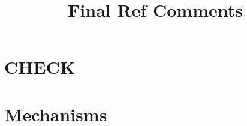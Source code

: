 \documentclass{article}
\title{Final Ref Comments}
\begin{document}
\maketitle
\tableofcontents
{\footnotesize 
\listoffigures
\listoftables}
\clearpage

\section{CHECK}
\clearpage
\begin{table}
\footnotesize
\centering
\caption{WF}
\begin{threeparttable}
\scriptsize

\end{threeparttable}
\label{tab:log_effect}
\end{table}
\clearpage

\begin{table}
\footnotesize
\centering
\caption{WF}
\begin{threeparttable}
\scriptsize

\end{threeparttable}
\label{tab:log_effect}
\end{table}
\clearpage


\section{Mechanisms}


\clearpage
\begin{table}
\footnotesize
\centering
\caption{WF}
\begin{threeparttable}
\scriptsize

\end{threeparttable}
\label{tab:log_effect}
\end{table}
\clearpage


\clearpage
\begin{table}
\footnotesize
\centering
\caption{WWF}
\begin{threeparttable}
\scriptsize

\end{threeparttable}
\label{tab:log_effect}
\end{table}
\clearpage

\clearpage
\begin{table}
\footnotesize
\centering
\caption{Mechs base}
\begin{threeparttable}
\scriptsize

\end{threeparttable}
\label{tab:log_effect}
\end{table}
\clearpage
\end{document}
